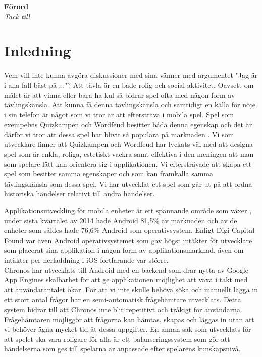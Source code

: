 \documentclass[a4paper, 11pt]{article}
\begin{document}
\newpage

\begin{center}
\textbf{Förord}\\
\textit{Tack till}
\end{center}
\newpage
\tableofcontents
\pagebreak




\section{Inledning}
Vem vill inte kunna avgöra diskussioner med sina vänner med argumentet "Jag är i alla fall bäst på ..."? 
Att tävla är en både rolig och social aktivitet. Oavsett om målet är att vinna eller bara ha kul så bidrar spel ofta med någon form av tävlingskänsla. Att kunna få denna tävlingskänsla och samtidigt en källa för nöje i sin telefon är något som vi tror är att eftersträva i mobila spel. Spel som exempelvis Quizkampen \cite{quiz} och Wordfeud \cite{wordfeud} besitter båda denna egenskap och det är därför vi tror att dessa spel har blivit så populära på marknaden \cite{appsalesrating}. Vi som utvecklare finner att Quizkampen och Wordfeud har lyckats väl med att designa spel som är enkla, roliga, estetiskt vackra samt effektiva i den meningen att man som spelare lätt kan orientera sig i applikationen. Vi eftersträvade att skapa ett spel som besitter samma egenskaper och som kan framkalla samma tävlingskänsla som dessa spel. Vi har utvecklat ett spel som går ut på att ordna historiska händelser relativt till andra händelser. 

Applikationsutveckling för mobila enheter är ett spännande område som växer \cite{IDC}, under sista kvartalet av 2014 hade Android 81,5\% av marknaden och av de enheter som såldes hade 76,6\% Android som operativsystem. Enligt Digi-Capital-Found \cite{revenue} var även Android operativsystemet som gav högst intäkter för utvecklare som placerat sina applikation i någon form av applikationsmarknad, även om intäkter per nerladdning i iOS fortfarande var större. \\

Chronos har utvecklats till Android med en backend som drar nytta av Google App Engines skalbarhet för att ge applikationen möjlighet att växa i takt med att användarantalet ökar. För att vi inte skulle behöva söka och manuellt lägga in ett stort antal frågor har en semi-automatisk frågehämtare utvecklats. Detta system bidrar till att Chronos inte blir repetitivt och tråkigt för användarna. Frågehämtaren möjliggör att frågorna kan hämtas, skapas och läggas in utan att vi behöver ägna mycket tid åt dessa uppgifter. En annan sak som utvecklats för att spelet ska vara roligare för alla är ett balanseringssystem som gör att händelserna som ges till spelarna är anpassade efter spelarens kunskapsnivå.
\end{document}
